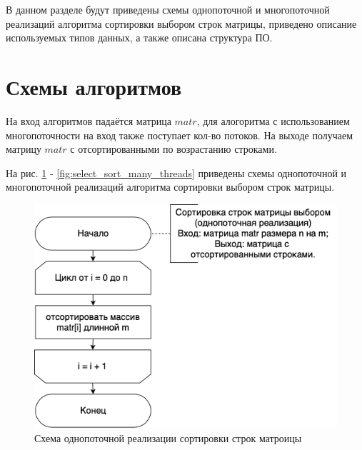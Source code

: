 \documentclass[a4paper,14pt, unknownkeysallowed]{extreport}
\begin{document}
В данном разделе будут приведены схемы однопоточной и многопоточной реализаций алгоритма сортировки выбором строк матрицы, приведено описание используемых типов данных, а также описана структура ПО.

\section{Схемы алгоритмов}

На вход алгоритмов падаётся матрица $matr$, для алогоритма с использованием многопоточности на вход также поступает кол-во потоков. На выходе получаем матрицу $matr$ с отсортированными по возрастанию строками.

На рис. \ref{fig:select_sort_one_thread} - \ref{fig:select_sort_many_threads} приведены схемы однопоточной и многопоточной реализаций алгоритма сортировки выбором строк матрицы.

\begin{figure}[h]
	\centering
	\includegraphics[scale=0.7]{img/select_sort_one_thread_scheme.png}
	\caption{Схема однопоточной реализации сортировки строк матроицы}
	\label{fig:select_sort_one_thread}
\end{figure}

\clearpage
\end{document}
